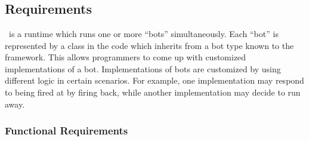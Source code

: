 %

\chapter{\AI}
\label{AI}

\section{Requirements}

\AI\ is a runtime which runs one or more ``bots'' simultaneously. Each ``bot'' is represented by a class in the code which inherits from a bot type known to the framework. This allows programmers to come up with customized implementations of a bot. Implementations of bots are customized by using different logic in certain scenarios. For example, one implementation may respond to being fired at by firing back, while another implementation may decide to run away.

\subsection{Functional Requirements}

